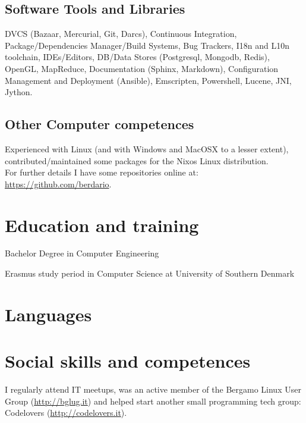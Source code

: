\documentclass[helvetica,narrow,english,booktabs,a4paper]{moderncv}
\begin{document}
  \clearpage
  \subsection{Software Tools and Libraries}
  DVCS (Bazaar, Mercurial, Git, Darcs), Continuous Integration, Package/Dependencies Manager/Build Systems, Bug
  Trackers, I18n and L10n toolchain, IDEs/Editors, DB/Data Stores
  (Postgresql, Mongodb, Redis), OpenGL, MapReduce, Documentation (Sphinx, Markdown),
  Configuration Management and Deployment (Ansible), Emscripten, Powershell, Lucene, JNI, Jython.
  \subsection{Other Computer competences}
  Experienced with Linux (and with Windows and MacOSX to a lesser extent), contributed/maintained some packages for the Nixos Linux distribution.\\
  For further details I have some repositories online at: \url{https://github.com/berdario}.

  \section{Education and training}
  Bachelor Degree in Computer Engineering\\

  Erasmus study period in Computer Science at University of Southern Denmark\\

  \section{Languages}

  \section{Social skills and competences}
  I regularly attend IT meetups, was an active member of the Bergamo Linux User Group (\url{http://bglug.it}) and helped start another small programming tech group: Codelovers (\url{http://codelovers.it}).
\end{document}
